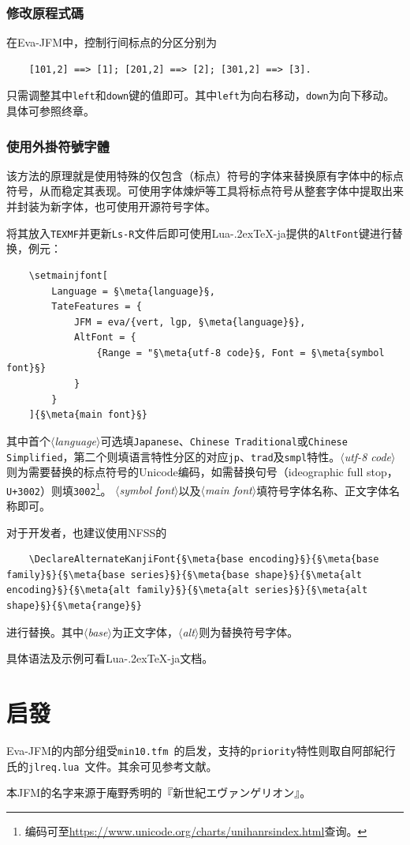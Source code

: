 \documentclass[twoside]{ltjsarticle}
\def\meta#1{{\normalfont\rmfamily\itshape$\langle$#1\/$\rangle$}}
\def\段{\par}
\def\LuaTeX{Lua\kern-.2ex\TeX}
\begin{document}
\subsubsection{修改原程式碼}
在\textsf{Eva-JFM}中，控制行间标点的分区分别为
\begin{lstlisting}
    [101,2] ==> [1]; [201,2] ==> [2]; [301,2] ==> [3].
\end{lstlisting}
只需调整其中\texttt{left}和\texttt{down}键的值即可。其中\texttt{left}为向右移动，\texttt{down}为向下移动。
具体可参照终章。

\subsubsection{使用外掛符號字體}
该方法的原理就是使用特殊的仅包含（标点）符号的字体来替换原有字体中的标点符号，从而稳定其表现。可使用字体煉炉等工具将标点符号从整套字体中提取出来并封装为新字体，也可使用开源符号字体。\段
将其放入\texttt{TEXMF}并更新\texttt{Ls-R}文件后即可使用\LuaTeX-ja提供的\texttt{AltFont}键进行替换，例元：
\begin{lstlisting}
    \setmainjfont[
        Language = §\meta{language}§,
        TateFeatures = {
            JFM = eva/{vert, lgp, §\meta{language}§},
            AltFont = {
                {Range = "§\meta{utf-8 code}§, Font = §\meta{symbol font}§}
            }
        }
    ]{§\meta{main font}§}
\end{lstlisting}
其中首个\meta{language}可选填\texttt{Japanese}、\texttt{Chinese Traditional}或\texttt{Chinese Simplified}，第二个则填语言特性分区的对应\texttt{jp}、\texttt{trad}及\texttt{smpl}特性。\meta{utf-8 code}则为需要替换的标点符号的Unicode编码，如需替换句号（ideographic full stop，\texttt{U+3002}）则填\texttt{3002}\footnote{编码可至\url{https://www.unicode.org/charts/unihanrsindex.html}查询。}。
\meta{symbol font}以及\meta{main font}填符号字体名称、正文字体名称即可。\段
对于开发者，也建议使用NFSS的
\begin{lstlisting}
    \DeclareAlternateKanjiFont{§\meta{base encoding}§}{§\meta{base family}§}{§\meta{base series}§}{§\meta{base shape}§}{§\meta{alt encoding}§}{§\meta{alt family}§}{§\meta{alt series}§}{§\meta{alt shape}§}{§\meta{range}§}
\end{lstlisting}
进行替换。其中\meta{base}为正文字体，\meta{alt}则为替换符号字体。\段
具体语法及示例可看\LuaTeX-ja文档\cite{luatexja-doc}。

\section{启發}
\textsf{Eva-JFM}的内部分组受\texttt{min10.tfm}~\cite{min10}的启发，支持的\texttt{priority}特性则取自阿部紀行氏的\texttt{jlreq.lua}~\cite{ltxjlreq}文件。其余可见参考文献。\段
本JFM的名字来源于庵野秀明的『新世紀エヴァンゲリオン』。
\end{document}
